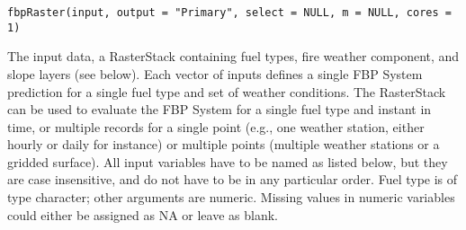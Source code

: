 \documentclass[a4paper]{book}
\begin{document}
%
\begin{Usage}
\begin{verbatim}
fbpRaster(input, output = "Primary", select = NULL, m = NULL, cores = 1)
\end{verbatim}
\end{Usage}
%
\begin{Arguments}
\begin{ldescription}
\item[\code{input}] The input data, a RasterStack containing fuel types, fire
weather component, and slope layers (see below). Each vector of inputs
defines a single FBP System prediction for a single fuel type and set of
weather conditions. The RasterStack can be used to evaluate the FBP System
for a single fuel type and instant in time, or multiple records for a single
point (e.g., one weather station, either hourly or daily for instance) or
multiple points (multiple weather stations or a gridded surface). All input
variables have to be named as listed below, but they are case insensitive,
and do not have to be in any particular order. Fuel type is of type
character; other arguments are numeric. Missing values in numeric variables
could either be assigned as NA or leave as blank.


\end{ldescription}
\end{Arguments}
\end{document}
